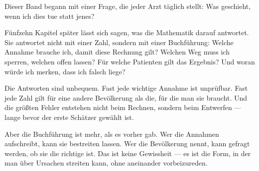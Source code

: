 \begin{merksatz}
\begin{center}
\begin{minipage}{0.9\textwidth}
Dieser Band begann mit einer Frage, die jeder Arzt täglich stellt: Was geschieht, wenn ich dies tue statt jenes?

Fünfzehn Kapitel später lässt sich sagen, was die Mathematik darauf antwortet. Sie antwortet nicht mit einer Zahl, sondern mit einer Buchführung: Welche Annahme brauche ich, damit diese Rechnung gilt? Welchen Weg muss ich sperren, welchen offen lassen? Für welche Patienten gilt das Ergebnis? Und woran würde ich merken, dass ich falsch liege?

Die Antworten sind unbequem. Fast jede wichtige Annahme ist unprüfbar. Fast jede Zahl gilt für eine andere Bevölkerung als die, für die man sie braucht. Und die größten Fehler entstehen nicht beim Rechnen, sondern beim Entwerfen --- lange bevor der erste Schätzer gewählt ist.

Aber die Buchführung ist mehr, als es vorher gab. Wer die Annahmen aufschreibt, kann sie bestreiten lassen. Wer die Bevölkerung nennt, kann gefragt werden, ob sie die richtige ist. Das ist keine Gewissheit --- es ist die Form, in der man über Ursachen streiten kann, ohne aneinander vorbeizureden.
\end{minipage}
\end{center}

\begin{center}
\begin{minipage}{0.88\textwidth}
\end{minipage}
\end{center}
\end{merksatz}
